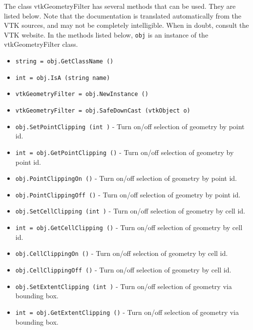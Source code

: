 The class vtkGeometryFilter has several methods that can be used.
  They are listed below.
Note that the documentation is translated automatically from the VTK sources,
and may not be completely intelligible.  When in doubt, consult the VTK website.
In the methods listed below, \verb|obj| is an instance of the vtkGeometryFilter class.
\begin{itemize}
\item  \verb|string = obj.GetClassName ()|

\item  \verb|int = obj.IsA (string name)|

\item  \verb|vtkGeometryFilter = obj.NewInstance ()|

\item  \verb|vtkGeometryFilter = obj.SafeDownCast (vtkObject o)|

\item  \verb|obj.SetPointClipping (int )| -  Turn on/off selection of geometry by point id.

\item  \verb|int = obj.GetPointClipping ()| -  Turn on/off selection of geometry by point id.

\item  \verb|obj.PointClippingOn ()| -  Turn on/off selection of geometry by point id.

\item  \verb|obj.PointClippingOff ()| -  Turn on/off selection of geometry by point id.

\item  \verb|obj.SetCellClipping (int )| -  Turn on/off selection of geometry by cell id.

\item  \verb|int = obj.GetCellClipping ()| -  Turn on/off selection of geometry by cell id.

\item  \verb|obj.CellClippingOn ()| -  Turn on/off selection of geometry by cell id.

\item  \verb|obj.CellClippingOff ()| -  Turn on/off selection of geometry by cell id.

\item  \verb|obj.SetExtentClipping (int )| -  Turn on/off selection of geometry via bounding box.

\item  \verb|int = obj.GetExtentClipping ()| -  Turn on/off selection of geometry via bounding box.


\end{itemize}
